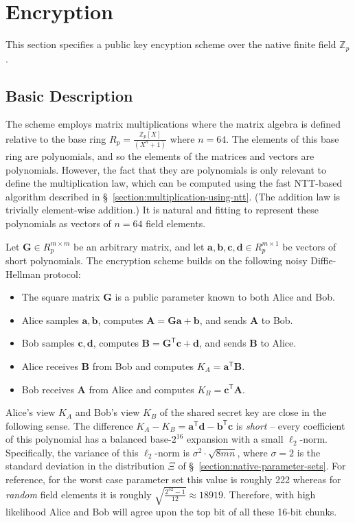 
\section{Encryption}
\label{section:encryption}

This section specifies a public key encyption scheme over the native finite field $\mathbb{Z}_p$. 

\subsection{Basic Description}

The scheme employs matrix multiplications where the matrix algebra is defined relative to the base ring $R_p = \frac{\mathbb{Z}_p[X]}{(X^n + 1)}$ where $n=64$. The elements of this base ring are polynomials, and so the elements of the matrices and vectors are polynomials. However, the fact that they are polynomials is only relevant to define the multiplication law, which can be computed using the fast NTT-based algorithm described in \S~\ref{section:multiplication-using-ntt}. (The addition law is trivially element-wise addition.) It is natural and fitting to represent these polynomials as vectors of $n=64$ field elements.

Let $\mathbf{G} \in R_p^{m \times m}$ be an arbitrary matrix, and let $\mathbf{a}, \mathbf{b}, \mathbf{c}, \mathbf{d} \in R_p^{m \times 1}$ be vectors of short polynomials. The encryption scheme builds on the following noisy Diffie-Hellman protocol:
\begin{itemize}
\item The square matrix $\mathbf{G}$ is a public parameter known to both Alice and Bob.
\item Alice samples $\mathbf{a}, \mathbf{b}$, computes $\mathbf{A} = \mathbf{G} \mathbf{a} + \mathbf{b}$, and sends $\mathbf{A}$ to Bob.
\item Bob samples $\mathbf{c}, \mathbf{d}$, computes $\mathbf{B} = \mathbf{G}^\mathsf{T} \mathbf{c} + \mathbf{d}$, and sends $\mathbf{B}$ to Alice.
\item Alice receives $\mathbf{B}$ from Bob and computes $K_A = \mathbf{a}^\mathsf{T} \mathbf{B}$.
\item Bob receives $\mathbf{A}$ from Alice and computes $K_B = \mathbf{c}^\mathsf{T} \mathbf{A}$.
\end{itemize}
Alice's view $K_A$ and Bob's view $K_B$ of the shared secret key are close in the following sense. The difference $K_A - K_B = \mathbf{a}^\mathsf{T} \mathbf{d} - \mathbf{b}^\mathsf{T} \mathbf{c}$ is \emph{short} -- every coefficient of this polynomial has a balanced base-$2^{16}$ expansion with a small $\ell_2$-norm. Specifically, the variance of this $\ell_2$-norm is $\sigma^2 \cdot \sqrt{8mn}$, where $\sigma=2$ is the standard deviation in the distribution $\Xi$ of \S~\ref{section:native-parameter-sets}. For reference, for the worst case parameter set this value is roughly 222 whereas for \emph{random} field elements it is roughly $\sqrt{\frac{2^{32}-1}{12}} \approx 18919$. Therefore, with high likelihood Alice and Bob will agree upon the top bit of all these 16-bit chunks. 

